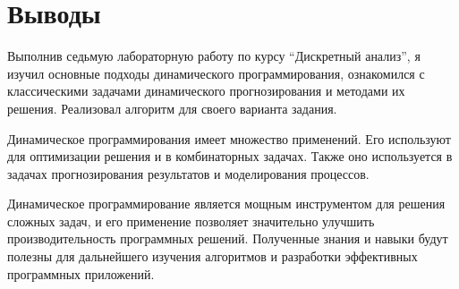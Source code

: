 \section{Выводы}

Выполнив седьмую лабораторную работу по курсу \enquote{Дискретный анализ}, 
я изучил основные подходы динамического программирования, ознакомился с классическими задачами динамического прогнозирования и методами их решения.
Реализовал алгоритм для своего варианта задания.

Динамическое программирования имеет множество применений. Его используют для оптимизации решения и в комбинаторных задачах. 
Также оно используется в задачах прогнозирования результатов и моделирования процессов.

Динамическое программирование является мощным инструментом для решения сложных задач, 
и его применение позволяет значительно улучшить производительность программных решений. 
Полученные знания и навыки будут полезны для дальнейшего изучения алгоритмов и разработки эффективных программных приложений.

\pagebreak